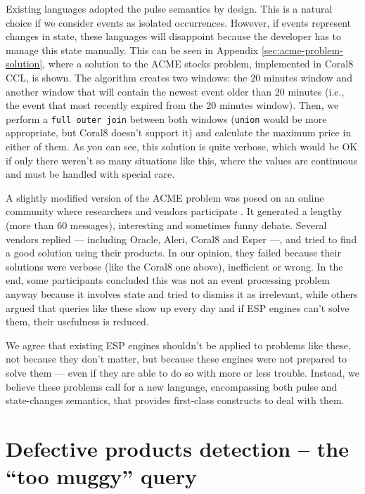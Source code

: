 Existing languages adopted the pulse semantics by design. This is a
natural choice if we consider events as isolated occurrences. However,
if events represent changes in state, these languages will disappoint
because the developer has to manage this state manually. This can be
seen in Appendix \ref{sec:acme-problem-solution}, where a solution to
the ACME stocks problem, implemented in Coral8 CCL, is shown. The
algorithm creates two windows: the 20 minutes window and another
window that will contain the newest event older than 20 minutes (i.e.,
the event that most recently expired from the 20 minutes
window). Then, we perform a \verb=full outer join= between both
windows (\verb=union= would be more appropriate, but Coral8 doesn't
support it) and calculate the maximum price in either of them. As you
can see, this solution is quite verbose, which would be OK if only
there weren't so many situations like this, where the values are
continuous and must be handled with special care.

A slightly modified version of the ACME problem was posed on an online
community where researchers and vendors participate
\cite{simple-problem} \cite{simple-problem2}. It generated a lengthy
(more than 60 messages), interesting and sometimes funny
debate. Several vendors replied --- including Oracle, Aleri, Coral8
and Esper ---, and tried to find a good solution using their
products. In our opinion, they failed because their solutions were
verbose (like the Coral8 one above), inefficient or wrong. In the end,
some participants concluded this was not an event processing problem
anyway because it involves state and tried to dismiss it as
irrelevant, while others argued that queries like these show up every
day and if ESP engines can't solve them, their usefulness is reduced.

We agree that existing ESP engines shouldn't be applied to problems
like these, not because they don't matter, but because these engines
were not prepared to solve them --- even if they are able to do so
with more or less trouble. Instead, we believe these problems call for
a new language, encompassing both pulse and state-changes semantics,
that provides first-class constructs to deal with them.



\section{Defective products detection -- the ``too muggy'' query}
\label{sec:defective-products}


